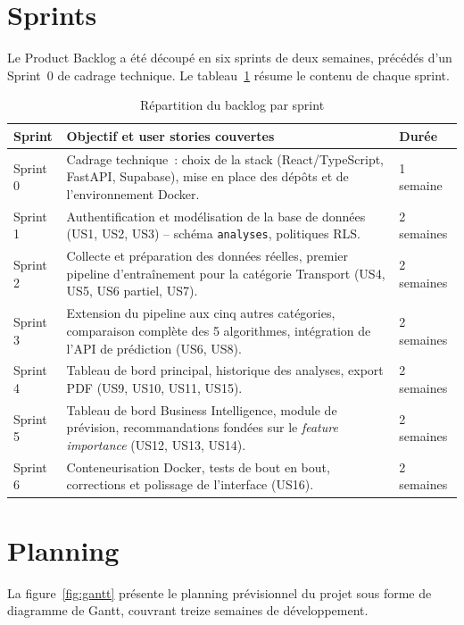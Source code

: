 \section{Sprints}

Le Product Backlog a été découpé en six sprints de deux semaines, précédés d'un Sprint~0 de cadrage technique. Le tableau~\ref{tab:sprints} résume le contenu de chaque sprint.

\begin{table}[H]
\centering
\caption{Répartition du backlog par sprint}
\label{tab:sprints}
\begin{tabular}{|p{1.6cm}|p{9.3cm}|p{2.3cm}|}
\hline
\rowcolor{isiBlue!15}
\textbf{Sprint} & \textbf{Objectif et user stories couvertes} & \textbf{Durée} \\
\hline
Sprint 0 & Cadrage technique~: choix de la stack (React/TypeScript, FastAPI, Supabase), mise en place des dépôts et de l'environnement Docker. & 1 semaine \\ \hline
Sprint 1 & Authentification et modélisation de la base de données (US1, US2, US3) -- schéma \texttt{analyses}, politiques RLS. & 2 semaines \\ \hline
Sprint 2 & Collecte et préparation des données réelles, premier pipeline d'entraînement pour la catégorie Transport (US4, US5, US6 partiel, US7). & 2 semaines \\ \hline
Sprint 3 & Extension du pipeline aux cinq autres catégories, comparaison complète des 5 algorithmes, intégration de l'API de prédiction (US6, US8). & 2 semaines \\ \hline
Sprint 4 & Tableau de bord principal, historique des analyses, export PDF (US9, US10, US11, US15). & 2 semaines \\ \hline
Sprint 5 & Tableau de bord Business Intelligence, module de prévision, recommandations fondées sur le \textit{feature importance} (US12, US13, US14). & 2 semaines \\ \hline
Sprint 6 & Conteneurisation Docker, tests de bout en bout, corrections et polissage de l'interface (US16). & 2 semaines \\ \hline
\end{tabular}
\end{table}

\section{Planning}

La figure~\ref{fig:gantt} présente le planning prévisionnel du projet sous forme de diagramme de Gantt, couvrant treize semaines de développement.

